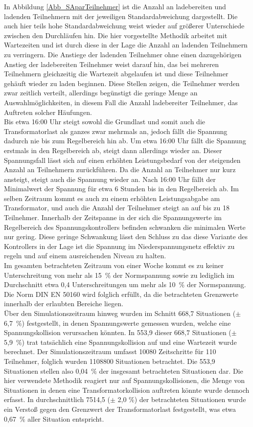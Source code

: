 In Abbildung \ref{Abb_SAparTeilnehmer} ist die Anzahl an ladebereiten und ladenden Teilnehmern mit der jeweiligen Standardabweichung dargestellt. Die auch hier teils hohe Standardabweichung weist wieder auf größerer Unterschiede zwischen den Durchläufen hin. Die hier vorgestellte Methodik arbeitet mit Wartezeiten und ist durch diese in der Lage die Anzahl an ladenden Teilnehmern zu verringern. Die Anstiege der ladenden Teilnehmer ohne einen dazugehörigen Anstieg der ladebereiten Teilnehmer weist darauf hin, das bei mehreren Teilnehmern gleichzeitig die Wartezeit abgelaufen ist und diese Teilnehmer gehäuft wieder zu laden beginnen. Diese Stellen zeigen, die Teilnehmer werden zwar zeitlich verteilt, allerdings begünstigt die geringe Menge an Auswahlmöglichkeiten, in diesem Fall die Anzahl ladebereiter Teilnehmer, das Auftreten solcher Häufungen. \\
Bis etwa 16:00 Uhr steigt sowohl die Grundlast und somit auch die Transformatorlast als ganzes zwar mehrmals an, jedoch fällt die Spannung dadurch nie bis zum Regelbereich hin ab. Um etwa 16:00 Uhr fällt die Spannung erstmals in den Regelbereich ab, steigt dann allerdings wieder an. Dieser Spannungsfall lässt sich auf einen erhöhten Leistungsbedarf von der steigenden Anzahl an Teilnehmern zurückführen. Da die Anzahl an Teilnehmer nur kurz ansteigt, steigt auch die Spannung wieder an. Nach 16:00 Uhr fällt der Minimalwert der Spannung für etwa 6 Stunden bis in den Regelbereich ab. Im selben Zeitraum kommt es auch zu einem erhöhten Leistungsabgabe am Transformator, und auch die Anzahl der Teilnehmer steigt an auf bis zu 18 Teilnehmer. Innerhalb der Zeitspanne in der sich die Spannungswerte im Regelbereich des Spannungskontrollers befinden schwanken die minimalen Werte nur gering. Diese geringe Schwankung lässt den Schluss zu das diese Variante des Kontrollers in der Lage ist die Spannung im Niederspannungsnetz effektiv zu regeln und auf einem ausreichenden Niveau zu halten. \\
Im gesamten betrachteten Zeitraum von einer Woche kommt es zu keiner Unterschreitung von mehr als 15~\% der Normspannung sowie zu lediglich im Durchschnitt etwa 0,4 Unterschreitungen um mehr als 10~\% der Normspannung. Die Norm DIN EN 50160 wird folglich erfüllt, da die betrachteten Grenzwerte innerhalb der erlaubten Bereiche liegen.\\
Über den Simulationszeitraum hinweg wurden im Schnitt 668,7 Situationen ($\pm$ 6,7~\%) festgestellt, in denen Spannungswerte gemessen wurden, welche eine Spannungskollision verursachen könnten. In 553,9 dieser 668,7 Situationen ($\pm$ 5,9~\%) trat tatsächlich eine Spannungskollision auf und eine Wartezeit wurde berechnet. Der Simulationszeitraum umfasst 10080 Zeitschritte für 110 Teilnehmer, folglich wurden 1108800 Situationen betrachtet. Die 553,9 Situationen stellen also 0,04~\% der insgesamt betrachteten Situationen dar. Die hier verwendete Methodik reagiert nur auf Spannungskollisionen, die Menge von Situationen in denen eine Transformatorkollision auftreten könnte wurde dennoch erfasst. In durchschnittlich 7514,5 ($\pm$ 2,0 \%) der betrachteten Situationen wurde ein Verstoß gegen den Grenzwert der Transformatorlast festgestellt, was etwa 0,67~\% aller Situation entspricht.\\
